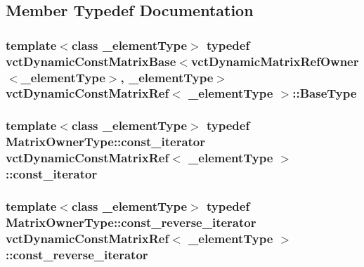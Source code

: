 \subsection{Member Typedef Documentation}
\hypertarget{classvct_dynamic_const_matrix_ref_a0e57e53f6e3703384598d165b430f0e8}{
\subsubsection[{Base\-Type}]{\setlength{\rightskip}{0pt plus 5cm}template$<$class \-\_\-element\-Type$>$ typedef {\bf vct\-Dynamic\-Const\-Matrix\-Base}$<${\bf vct\-Dynamic\-Matrix\-Ref\-Owner}$<$\-\_\-element\-Type$>$, \-\_\-element\-Type$>$ {\bf vct\-Dynamic\-Const\-Matrix\-Ref}$<$ \-\_\-element\-Type $>$\-::{\bf Base\-Type}}}\label{classvct_dynamic_const_matrix_ref_a0e57e53f6e3703384598d165b430f0e8}
\hypertarget{classvct_dynamic_const_matrix_ref_ad5222f7776fb22e1fbf36980d1b2022b}{
\subsubsection[{const\-\_\-iterator}]{\setlength{\rightskip}{0pt plus 5cm}template$<$class \-\_\-element\-Type$>$ typedef {\bf Matrix\-Owner\-Type\-::const\-\_\-iterator} {\bf vct\-Dynamic\-Const\-Matrix\-Ref}$<$ \-\_\-element\-Type $>$\-::{\bf const\-\_\-iterator}}}\label{classvct_dynamic_const_matrix_ref_ad5222f7776fb22e1fbf36980d1b2022b}
\hypertarget{classvct_dynamic_const_matrix_ref_aab47ab9afbf2163300fb700fa5240550}{
\subsubsection[{const\-\_\-reverse\-\_\-iterator}]{\setlength{\rightskip}{0pt plus 5cm}template$<$class \-\_\-element\-Type$>$ typedef {\bf Matrix\-Owner\-Type\-::const\-\_\-reverse\-\_\-iterator} {\bf vct\-Dynamic\-Const\-Matrix\-Ref}$<$ \-\_\-element\-Type $>$\-::{\bf const\-\_\-reverse\-\_\-iterator}}}\label{classvct_dynamic_const_matrix_ref_aab47ab9afbf2163300fb700fa5240550}
